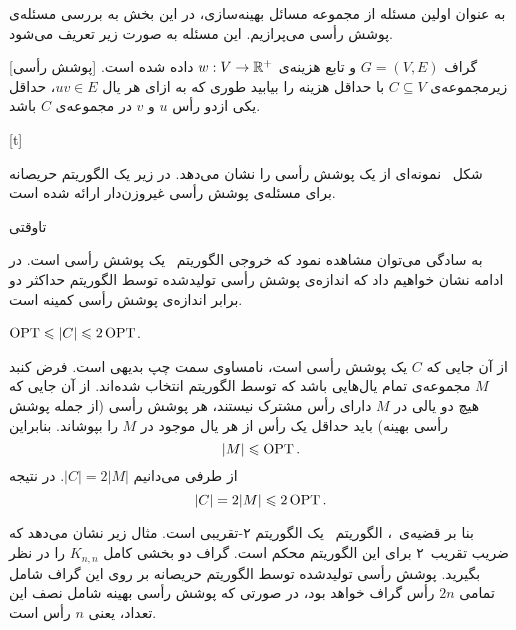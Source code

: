 
به عنوان اولین مسئله از مجموعه مسائل بهینه‌سازی،
در این بخش به بررسی مسئله‌ی پوشش رأسی می‌پرازیم.
این مسئله به صورت زیر تعریف می‌شود.

[پوشش رأسی]
گراف $G=(V,E)$  و تابع هزینه‌ی $w:V \rightarrow \mathbb{R}^{+}$ داده شده است.
زیرمجموعه‌ی $C \subseteq V$ با حداقل هزینه را بیابید طوری که 
به ازای هر یال $uv \in E$، حداقل یکی ازدو رأس $u$ و $v$  در مجموعه‌ی $C$ باشد.


[t]


شکل~ 
نمونه‌ای از یک پوشش رأسی را نشان می‌دهد.
در زیر یک الگوریتم حریصانه برای مسئله‌ی پوشش رأسی غیروزن‌دار ارائه شده است.


‌تاوقتی


به سادگی می‌توان مشاهده نمود که خروجی الگوریتم~
یک پوشش رأسی است.
در ادامه نشان خواهیم داد که اندازه‌ی پوشش رأسی تولیدشده توسط الگوریتم
حداکثر دو برابر اندازه‌ی پوشش رأسی کمینه است.

 
$\mathop{\mathrm{OPT}} \leqslant |C| \leqslant 2 \mathop{\mathrm{OPT}}$.

از آن جایی که $C$ یک پوشش رأسی است، نامساوی سمت چپ بدیهی است.
فرض کنبد $M$ مجموعه‌ی تمام یال‌هایی باشد که توسط الگوریتم انتخاب شده‌اند. 
از آن‌ جایی که هیچ دو یالی در $M$ دارای رأس مشترک نیستند، 
هر پوشش رأسی (از جمله پوشش رأسی بهینه) 
باید حداقل یک رأس از هر یال موجود در $M$ را بپوشاند. بنابراین
$$|M| \leqslant \mathop{\mathrm{OPT}}.$$
از طرفی می‌دانیم $|C| = 2|M|$. در نتیجه
$$
	|C| = 2|M| \leqslant 2 \mathop{\mathrm{OPT}}.
$$

بنا بر قضیه‌ی~، 
الگوریتم~ یک الگوریتم ۲-تقریبی است.
مثال زیر نشان می‌دهد که ضریب تقریب~۲ برای این الگوریتم محکم است.
گراف دو بخشی کامل $K_{n,n}$ را در نظر بگیرید.
پوشش رأسی تولیدشده توسط الگوریتم حریصانه بر روی این گراف
شامل تمامی $2n$ رأس گراف خواهد بود، در صورتی که پوشش رأسی بهینه
شامل نصف این تعداد، یعنی $n$ رأس است.



